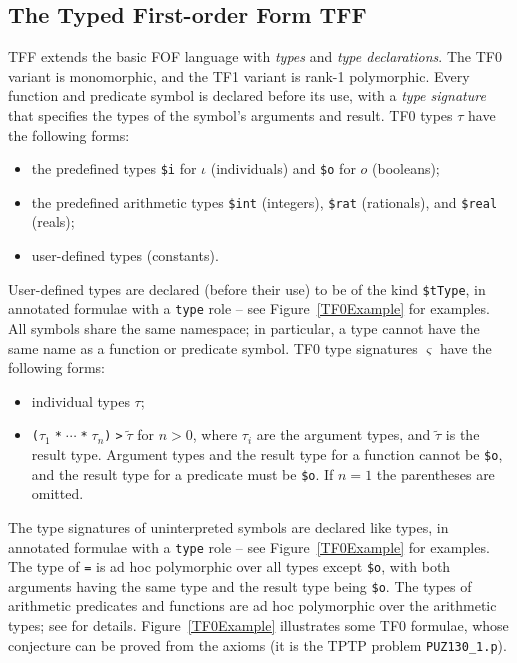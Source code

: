 \documentclass{easychair}
\begin{document}
\subsection{The Typed First-order Form TFF}
\label{TFF}

TFF extends the basic FOF language with {\em types} and {\em type
declarations}.
The TF0 variant is monomorphic, and the TF1 variant is rank-1 polymorphic.
Every function and predicate symbol is declared before its use, with
a {\em type signature} that specifies the types of the symbol's arguments
and result.
TF0 types $\tau$ have the following forms:
\begin{itemize}
\item the predefined types {\tt \$i} for $\iota$ (individuals) and
      {\tt \$o} for $o$ (booleans);
\item the predefined arithmetic types {\tt \$int} (integers), {\tt \$rat}
      (rationals), and {\tt \$real} (reals);
\item user-defined types (constants).
\end{itemize}
User-defined types are declared (before their use) to be of the kind
{\tt \$tType}, in annotated formulae with a {\tt type} role -- see
Figure~\ref{TF0Example} for examples.
All symbols share the same namespace; in particular, a type cannot have the
same name as a function or predicate symbol.
TF0 type signatures $\varsigma$ have the following forms:
\begin{itemize}
\item individual types $\tau$;
\item {\tt ($\tau_1\;$*$\;{\cdots}\;$*$\;\tau_n$)$\;$>$\;\tilde \tau$}
      for $n > 0$, where $\tau_i$ are the argument types, and $\tilde \tau$
      is the result type.
      Argument types and the result type for a function cannot be
      {\tt \$o}, and the result type for a predicate must be {\tt \$o}.
      If $n = 1$ the parentheses are omitted.
\end{itemize}
The type signatures of uninterpreted symbols are declared like types, in
annotated formulae with a {\tt type} role -- see Figure~\ref{TF0Example}
for examples.
The type of {\tt =} is ad hoc polymorphic over all types except {\tt \$o},
with both arguments having the same type and the result type being {\tt \$o}.
The types of arithmetic predicates and functions are ad hoc polymorphic
over the arithmetic types; see \cite{SS+12} for details.
Figure~\ref{TF0Example} illustrates some TF0 formulae, whose conjecture can
be proved from the axioms (it is the TPTP problem {\tt PUZ130\_1.p}).
\end{document}
